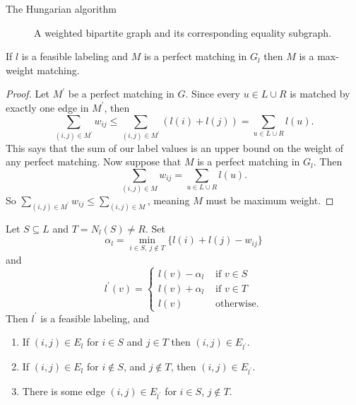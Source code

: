 \documentclass[11pt]{article}
\renewcommand{\'}{^{'}}
\newenvironment{theorem}[2][Theorem]{\begin{trivlist}
\item[\hskip \labelsep {\bfseries #1}\hskip \labelsep {\bfseries #2.}]}{\end{trivlist}}
\newenvironment{lemma}[2][Lemma]{\begin{trivlist}
\item[\hskip \labelsep {\bfseries #1}\hskip \labelsep {\bfseries #2.}]}{\end{trivlist}}
\begin{document}
\begin{section}{The Hungarian algorithm}
\begin{figure}[h]
		\caption{A weighted bipartite graph and its corresponding equality subgraph.}
	\end{figure}
	\begin{theorem}{(Kuhn-Munkres)}
		If $l$ is a feasible labeling and $M$ is a perfect matching in $G_l$ then $M$ is a 
		max-weight matching.
	\end{theorem}

	\begin{proof}
		Let $M\'$ be a perfect matching in $G$. Since every $u\in L\cup R$ is matched 
		by exactly one edge in $M\'$, then 
		\[
			\sum_{(i,j)\in M\'} w_{ij} \leq \sum_{(i,j)\in M\'} (l(i)+l(j)) = 
			\sum_{u\in L\cup R} l(u).
		\]
		This says that the sum of our label values is an upper bound on the weight of any 
		perfect matching.
		Now suppose that $M$ is a perfect matching in $G_l$. Then 
		\[
			\sum_{(i,j)\in M} w_{ij} = \sum_{u\in L\cup R} l(u).
		\]
		So $\sum_{(i,j)\in M\'} w_{ij} \leq \sum_{(i,j)\in M}$, meaning $M$ must be maximum 
		weight.
	\end{proof}

	\begin{lemma}{2}
		Let $S\subseteq L$ and $T = N_l(S) \neq R$. Set 
		\[
			\alpha_l = \min _{i\in S,\ j\notin T} \{l(i) + l(j) - w_{ij}\}
		\]
		and 
		\[
			l\' (v) = 
			\begin{cases}
				l(v) - \alpha_l &\text{ if } v\in S \\
				l(v) + \alpha_l &\text{ if } v\in T \\
				l(v) &\text{ otherwise.}
			\end{cases}
		\]
		Then $l\'$ is a feasible labeling, and 
		\begin{enumerate}
			\item If $(i,j)\in E_l$ for $i\in S$ and $j\in T$ then $(i,j)\in E_{l\'}$.
			\item If $(i,j)\in E_l$ for $i\notin S$, and $j\notin T$, then $(i,j)\in 
				E_{l\'}$.
			\item There is some edge $(i,j)\in E_{l\'}$ for $i\in S$, $j\notin T$.
		\end{enumerate}
	\end{lemma}


\end{section}
\end{document}

